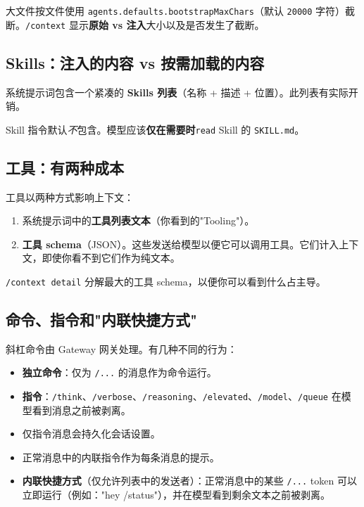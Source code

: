 大文件按文件使用 \texttt{agents.defaults.bootstrapMaxChars}（默认 \texttt{20000} 字符）截断。\texttt{/context} 显示\textbf{原始 vs 注入}大小以及是否发生了截断。

\subsection{Skills：注入的内容 vs 按需加载的内容}


系统提示词包含一个紧凑的 \textbf{Skills 列表}（名称 + 描述 + 位置）。此列表有实际开销。

Skill 指令默认\textit{不}包含。模型应该\textbf{仅在需要时}\texttt{read} Skill 的 \texttt{SKILL.md}。

\subsection{工具：有两种成本}


工具以两种方式影响上下文：

\begin{enumerate}
  \item 系统提示词中的\textbf{工具列表文本}（你看到的"Tooling"）。
  \item \textbf{工具 schema}（JSON）。这些发送给模型以便它可以调用工具。它们计入上下文，即使你看不到它们作为纯文本。
\end{enumerate}


\texttt{/context detail} 分解最大的工具 schema，以便你可以看到什么占主导。

\subsection{命令、指令和"内联快捷方式"}


斜杠命令由 Gateway 网关处理。有几种不同的行为：

\begin{itemize}
  \item \textbf{独立命令}：仅为 \texttt{/...} 的消息作为命令运行。
  \item \textbf{指令}：\texttt{/think}、\texttt{/verbose}、\texttt{/reasoning}、\texttt{/elevated}、\texttt{/model}、\texttt{/queue} 在模型看到消息之前被剥离。
  \item 仅指令消息会持久化会话设置。
  \item 正常消息中的内联指令作为每条消息的提示。
  \item \textbf{内联快捷方式}（仅允许列表中的发送者）：正常消息中的某些 \texttt{/...} token 可以立即运行（例如："hey /status"），并在模型看到剩余文本之前被剥离。
\end{itemize}


